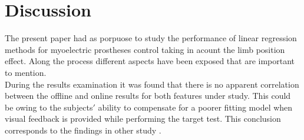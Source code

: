 \section{Discussion}
The present paper had as porpuose to study the performance of linear regression methods for myoelectric prostheses control taking in acount the limb position effect. Along the process different aspects have been exposed that are important to mention.\\

	
	During the results examination it was found that there is no apparent correlation between the offline and online results for both features under study. 
	This could be owing to the subjects$'$ ability to compensate for a poorer fitting model when visual feedback is provided while performing the target test. This conclusion corresponds to the findings in other study \cite{jiang2010}.
	
	
